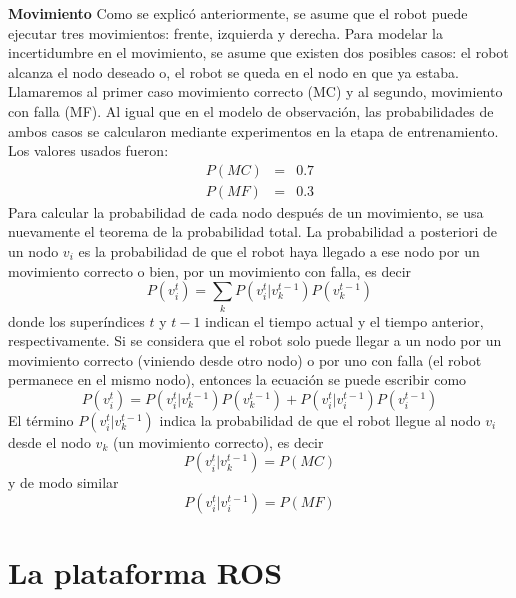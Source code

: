 \textbf{Movimiento}
Como se explicó anteriormente, se asume que el robot puede ejecutar tres movimientos: frente, izquierda y derecha. Para modelar la incertidumbre en el movimiento, se asume que existen dos posibles casos: el robot alcanza el nodo deseado o, el robot se queda en el nodo en que ya estaba. Llamaremos al primer caso movimiento correcto (MC) y al segundo, movimiento con falla (MF). Al igual que en el modelo de observación, las probabilidades de ambos casos se calcularon mediante experimentos en la etapa de entrenamiento. Los valores usados fueron:
\begin{eqnarray}
P(MC) &=& 0.7\\
P(MF) &=& 0.3
\end{eqnarray}
Para calcular la probabilidad de cada nodo después de un movimiento, se usa nuevamente el teorema de la probabilidad total. La probabilidad a posteriori de un nodo $v_i$ es la probabilidad de que el robot haya llegado a ese nodo por un movimiento correcto o bien, por un movimiento con falla, es decir
\begin{equation}
P\left(v_i^t\right) = \sum_k P\left(v_i^t|v_k^{t-1}\right) P\left(v_k^{t-1}\right)
\end{equation}
donde los superíndices $t$ y $t-1$ indican el tiempo actual y el tiempo anterior, respectivamente. Si se considera que el robot solo puede llegar a un nodo por un movimiento correcto (viniendo desde otro nodo) o por uno con falla (el robot permanece en el mismo nodo), entonces la ecuación se puede escribir como
\begin{equation}
P\left(v_i^t\right) = P\left(v_i^t|v_k^{t-1}\right)P\left(v_k^{t-1}\right) + P\left(v_i^t|v_i^{t-1}\right)P\left(v_i^{t-1}\right)
\end{equation}
El término $P\left(v_i^t|v_k^{t-1}\right)$ indica la probabilidad de que el robot llegue al nodo $v_i$ desde el nodo $v_k$ (un movimiento correcto), es decir
\begin{equation}
P\left(v_i^t|v_k^{t-1}\right) = P(MC)
\end{equation}
y de modo similar
\begin{equation}
P\left(v_i^t|v_i^{t-1}\right) = P(MF)
\end{equation}


\section{La plataforma ROS}

